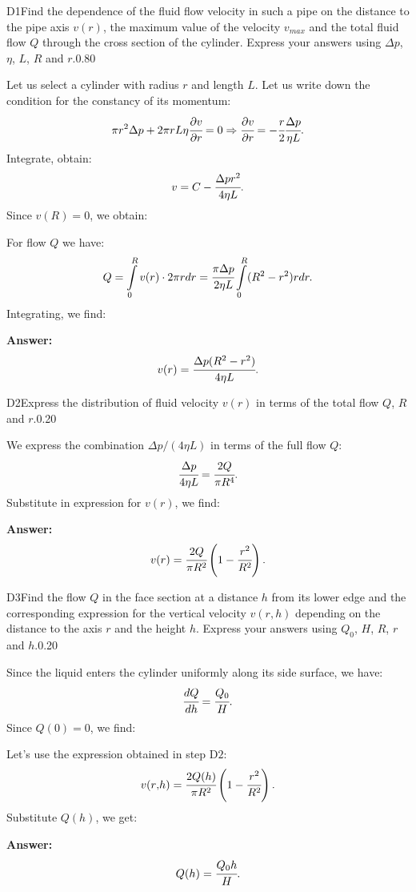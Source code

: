 \documentclass[11pt,a4paper]{article}
\begin{document}
\begin{solcard}{D1}{Find the dependence of the fluid flow velocity in such a pipe on the distance to the pipe axis $v(r)$, the maximum value of the velocity $v_{max}$ and the total fluid flow $Q$ through the cross section of the cylinder. Express your answers using $\Delta{p}$, $\eta$, $L$, $R$ and $r$.}{0.80}

Let us select a cylinder with radius $r$ and length $L$. Let us write down the condition for the constancy of its momentum: $$\pi r^2\Delta{p}+2\pi rL\eta\cfrac{\partial v}{\partial r}=0\Rightarrow \cfrac{\partial v}{\partial r}=-\cfrac{r}{2}\cfrac{\Delta{p}}{\eta L}{.} $$Integrate, obtain: $$v=C-\cfrac{\Delta{p}r^2}{4\eta L}{.} $$Since $v(R)=0$, we obtain:


For flow $Q$ we have: $$Q=\int\limits_0^Rv(r)\cdot 2\pi rdr=\cfrac{\pi\Delta{p}}{2\eta L}\int\limits_{0}^R (R^2-r^2)rdr{.} $$Integrating, we find:

\par\smallskip\noindent\textbf{Answer:} $$v(r)=\cfrac{\Delta{p}(R^2-r^2)}{4\eta L}{.} $$
\end{solcard}

\begin{solcard}{D2}{Express the distribution of fluid velocity $v(r)$ in terms of the total flow $Q$, $R$ and $r$.}{0.20}

We express the combination $\Delta{p}/(4\eta L)$ in terms of the full flow $Q$: $$\cfrac{\Delta{p}}{4\eta L}=\cfrac{2Q}{\pi R^4}{.} $$Substitute in expression for $v(r)$, we find:

\par\smallskip\noindent\textbf{Answer:} $$v(r)=\cfrac{2Q}{\pi R^2}\left(1-\cfrac{r^2}{R^2}\right){.} $$
\end{solcard}

\begin{solcard}{D3}{Find the flow $Q$ in the face section at a distance $h$ from its lower edge and the corresponding expression for the vertical velocity $v(r,h)$ depending on the distance to the axis $r$ and the height $h$. Express your answers using $Q_0$, $H$, $R$, $r$ and $h$.}{0.20}

Since the liquid enters the cylinder uniformly along its side surface, we have: $$\cfrac{dQ}{dh}=\cfrac{Q_0}{H}{.} $$Since $Q(0)=0$, we find:


Let's use the expression obtained in step $\mathrm{D2}$: $$v(r{,}h)=\cfrac{2Q(h)}{\pi R^2}\left(1-\cfrac{r^2}{R^2}\right){.} $$Substitute $Q(h)$, we get:

\par\smallskip\noindent\textbf{Answer:} $$Q(h)=\cfrac{Q_0h}{H}{.} $$
\end{solcard}
\end{document}

